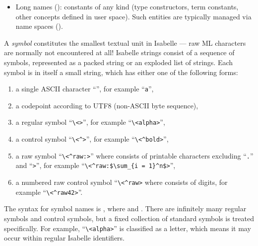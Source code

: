 \begin{isabellebody}
\begin{isamarkuptext}
\begin{itemize}
  \item Long names (): constants of any kind
  (type constructors, term constants, other concepts defined in user
  space).  Such entities are typically managed via name spaces
  ().

  \end{itemize}%
\end{isamarkuptext}%
\isamarkuptrue%
%
\isamarkuptrue%
%
\begin{isamarkuptext}%
A \emph{symbol} constitutes the smallest textual unit in
  Isabelle --- raw ML characters are normally not encountered at all!
  Isabelle strings consist of a sequence of symbols, represented as a
  packed string or an exploded list of strings.  Each symbol is in
  itself a small string, which has either one of the following forms:

  \begin{enumerate}

  \item a single ASCII character ``'', for example
  ``\verb,a,'',

  \item a codepoint according to UTF8 (non-ASCII byte sequence),

  \item a regular symbol ``\verb,\,\verb,<,\verb,>,'',
  for example ``\verb,\,\verb,<alpha>,'',

  \item a control symbol ``\verb,\,\verb,<^,\verb,>,'',
  for example ``\verb,\,\verb,<^bold>,'',

  \item a raw symbol ``\verb,\,\verb,<^raw:,\verb,>,''
  where  consists of printable characters excluding
  ``\verb,.,'' and ``\verb,>,'', for example
  ``\verb,\,\verb,<^raw:$\sum_{i = 1}^n$>,'',

  \item a numbered raw control symbol ``\verb,\,\verb,<^raw,\verb,>, where  consists of digits, for example
  ``\verb,\,\verb,<^raw42>,''.

  \end{enumerate}

  The  syntax for symbol names is , where  and .  There are infinitely many regular symbols and
  control symbols, but a fixed collection of standard symbols is
  treated specifically.  For example, ``\verb,\,\verb,<alpha>,'' is
  classified as a letter, which means it may occur within regular
  Isabelle identifiers.


\end{isamarkuptext}
\end{isabellebody}
